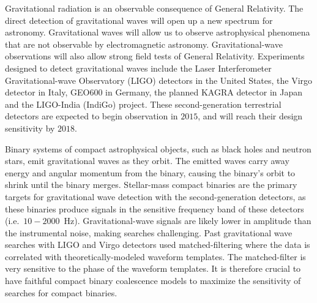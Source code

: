 
Gravitational radiation is an observable consequence of General Relativity.
The direct detection of gravitational waves will open up a new spectrum for 
astronomy. Gravitational waves will allow us to observe astrophysical phenomena
that are not observable by electromagnetic astronomy. 
Gravitational-wave observations will also allow strong field tests of
General Relativity. Experiments designed to detect gravitational waves include
the Laser Interferometer Gravitational-wave Observatory (LIGO) detectors in
the United States, the Virgo detector in Italy, GEO600 in Germany, the planned KAGRA
detector in Japan and the LIGO-India (IndiGo) project. These second-generation
terrestrial detectors are expected to begin observation in $2015$, and will
reach their design sensitivity by $2018$.

Binary systems of compact astrophysical objects, such as black holes and 
neutron stars, emit gravitational waves as they orbit. The emitted 
waves carry away energy and angular momentum from the binary, causing the binary's
orbit to shrink until the binary merges. Stellar-mass compact binaries are the primary
targets for gravitational wave detection with the second-generation detectors, 
as these binaries produce signals in the sensitive frequency band of these detectors
(i.e.~$10-2000$~Hz).
Gravitational-wave signals are likely lower in amplitude than the instrumental
noise, making searches challenging. 
Past gravitational wave searches with LIGO and Virgo detectors used 
matched-filtering where the data is correlated with theoretically-modeled 
waveform templates. 
The matched-filter is very sensitive to the phase of the waveform templates. It 
is therefore crucial to have faithful compact binary coalescence models to
maximize the sensitivity of searches for compact binaries.

